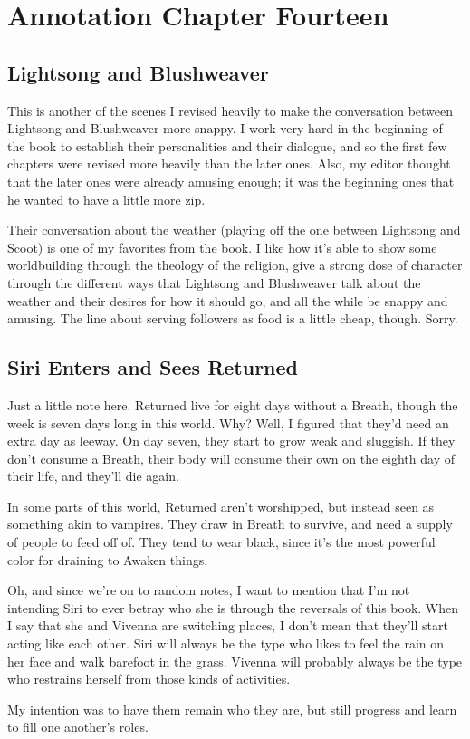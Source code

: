 \section{Annotation Chapter Fourteen}

\subsection*{Lightsong and Blushweaver}

This is another of the scenes I revised heavily to make the conversation between Lightsong and Blushweaver more snappy. I work very hard in the beginning of the book to establish their personalities and their dialogue, and so the first few chapters were revised more heavily than the later ones. Also, my editor thought that the later ones were already amusing enough; it was the beginning ones that he wanted to have a little more zip.

Their conversation about the weather (playing off the one between Lightsong and Scoot) is one of my favorites from the book. I like how it’s able to show some worldbuilding through the theology of the religion, give a strong dose of character through the different ways that Lightsong and Blushweaver talk about the weather and their desires for how it should go, and all the while be snappy and amusing. The line about serving followers as food is a little cheap, though. Sorry.

\subsection*{Siri Enters and Sees Returned}

Just a little note here. Returned live for eight days without a Breath, though the week is seven days long in this world. Why? Well, I figured that they’d need an extra day as leeway. On day seven, they start to grow weak and sluggish. If they don’t consume a Breath, their body will consume their own on the eighth day of their life, and they’ll die again.

In some parts of this world, Returned aren’t worshipped, but instead seen as something akin to vampires. They draw in Breath to survive, and need a supply of people to feed off of. They tend to wear black, since it’s the most powerful color for draining to Awaken things.

Oh, and since we’re on to random notes, I want to mention that I’m not intending Siri to ever betray who she is through the reversals of this book. When I say that she and Vivenna are switching places, I don’t mean that they’ll start acting like each other. Siri will always be the type who likes to feel the rain on her face and walk barefoot in the grass. Vivenna will probably always be the type who restrains herself from those kinds of activities.

My intention was to have them remain who they are, but still progress and learn to fill one another’s roles.



